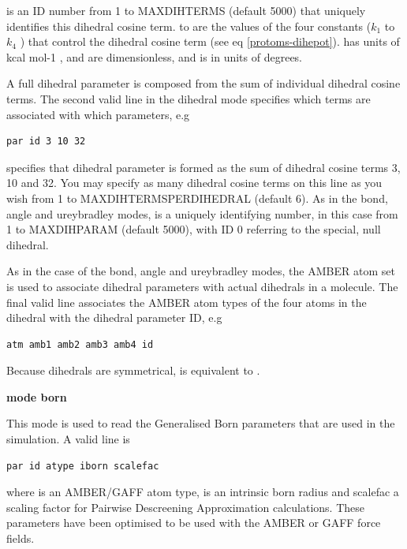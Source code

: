 \documentclass[letterpaper,10pt,english]{sphinxmanual}
\begin{document}
 is an ID number from 1 to MAXDIHTERMS (default 5000) that uniquely identifies this dihedral cosine term.  to  are the values of the four constants (\(k_1\) to \(k_4\) ) that control the dihedral cosine term (see eq \eqref{protoms-dihepot}).  has units of kcal mol-1 ,  and  are dimensionless, and  is in units of degrees.

A full dihedral parameter is composed from the sum of individual dihedral cosine terms. The second valid line in the dihedral mode specifies which terms are associated with which parameters, e.g

\begin{Verbatim}[frame=single,commandchars=\\\{\}]
par id 3 10 32
\end{Verbatim}

specifies that dihedral parameter  is formed as the sum of dihedral cosine terms 3, 10 and 32. You may specify as many dihedral cosine terms on this line as you wish from 1 to MAXDIHTERMSPERDIHEDRAL (default 6). As in the bond, angle and ureybradley modes,  is a uniquely identifying number, in this case from 1 to MAXDIHPARAM (default 5000), with ID 0 referring to the special, null dihedral.

As in the case of the bond, angle and ureybradley modes, the AMBER atom set is used to associate dihedral parameters with actual dihedrals in a molecule. The final valid line associates the AMBER atom types of the four  atoms in the dihedral with the dihedral parameter ID, e.g

\begin{Verbatim}[frame=single,commandchars=\\\{\}]
atm amb1 amb2 amb3 amb4 id
\end{Verbatim}

Because dihedrals are symmetrical,  is equivalent to .

\textbf{mode born}

This mode is used to read the Generalised Born parameters that are used in the simulation. A valid line is

\begin{Verbatim}[frame=single,commandchars=\\\{\}]
par id atype iborn scalefac
\end{Verbatim}

where  is an AMBER/GAFF atom type,  is an intrinsic born radius and scalefac a scaling factor for Pairwise Descreening Approximation calculations. These parameters have been optimised to be used with the AMBER or GAFF force fields.
\end{document}

